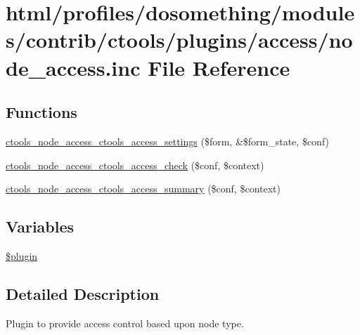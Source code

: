 \hypertarget{node__access_8inc}{
\section{html/profiles/dosomething/modules/contrib/ctools/plugins/access/node\_\-access.inc File Reference}
\label{node__access_8inc}
}
\subsection*{Functions}
\begin{DoxyCompactItemize}
\item 
\hyperlink{node__access_8inc_ad8e6a919e6531bec77f192f00ecceef7}{ctools\_\-node\_\-access\_\-ctools\_\-access\_\-settings} (\$form, \&\$form\_\-state, \$conf)
\item 
\hyperlink{node__access_8inc_a0c00d346504850ec0dbc5a42ac0fb41c}{ctools\_\-node\_\-access\_\-ctools\_\-access\_\-check} (\$conf, \$context)
\item 
\hyperlink{node__access_8inc_aa6855b44b07550dee12c6c5d123638ef}{ctools\_\-node\_\-access\_\-ctools\_\-access\_\-summary} (\$conf, \$context)
\end{DoxyCompactItemize}
\subsection*{Variables}
\begin{DoxyCompactItemize}
\item 
\hyperlink{node__access_8inc_ada8a7130088351710bb02ed622d6bf65}{\$plugin}
\end{DoxyCompactItemize}


\subsection{Detailed Description}
Plugin to provide access control based upon node type. 

